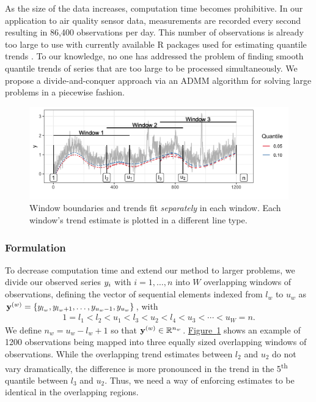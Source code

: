 \documentclass[aoas]{imsart}
\newcommand{\Fig}[1]{\hyperref[fig:#1]{Figure~\ref*{fig:#1}}} %
\newcommand{\Fig}[1]{{Figure~\ref{fig:#1}}} %
\newcommand{\Real}{\mathbb{R}}
\newcommand{\V}[1]{{\bm{\mathbf{\MakeLowercase{#1}}}}} %
\newcommand{\VE}[2]{\MakeLowercase{#1}_{#2}} %
\newcommand{\Vn}[2]{\V{#1}^{(#2)}} %
\begin{document}
 As the size of the data increases, computation time becomes prohibitive. In our application to air quality sensor data, measurements are recorded every second resulting in 86,400 observations per day. This number of observations is already too large to use with currently available R packages used for estimating quantile trends \citep{fields, quantreg}. To our knowledge, no one has addressed the problem of finding smooth quantile trends of series that are too large to be processed simultaneously. We propose a divide-and-conquer approach via an ADMM algorithm for solving large problems in a piecewise fashion. 
 
 \begin{figure}[!t]
 	\centering
 	\includegraphics[width = 0.8\linewidth]{Figures/overlapping_windows.png}
 	\caption{Window boundaries and trends fit {\em separately} in each window. Each window's trend estimate is plotted in a different line type.}
 	\label{fig:windows}
 \end{figure}
 
\subsubsection{Formulation}
 
 To decrease computation time and extend our method to larger problems, we divide our observed series $\VE{y}{i}$ with $i = 1, \ldots, n$ into $W$ overlapping windows of observations, defining the vector of sequential elements indexed from $l_w$ to $u_w$ as $\Vn{y}{w} = \{y_{l_w}, y_{l_w + 1}, \ldots, y_{u_w -1}, y_{u_w}\}$, with 
 \begin{eqnarray*}
 	1 = l_{1} < l_{2} < u_{1} < l_{3} < u_{2} < l_{4} < u_{3} < \cdots < u_{W} = n.
 \end{eqnarray*}
 We define $n_w = u_w-l_w+1$ so that $\Vn{y}{w} \in \Real^{n_w}$. \Fig{windows} shows an example of 1200 observations being mapped into three equally sized overlapping windows of observations. While the overlapping trend estimates between $l_2$ and $u_2$ do not vary dramatically, the difference is more pronounced in the trend in the 5\textsuperscript{th} quantile between $l_3$ and $u_2$. Thus, we need a way of enforcing estimates to be identical in the overlapping regions. 
 
\end{document}
